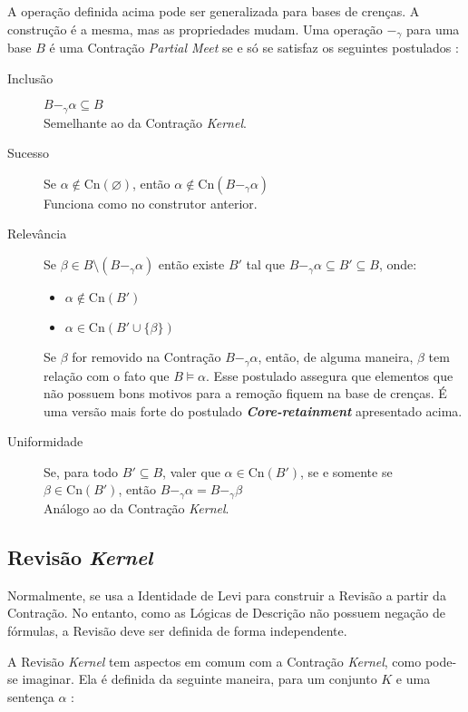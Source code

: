 A operação definida acima pode ser generalizada para bases de crenças. A construção é a mesma, mas as propriedades mudam. Uma operação $ -_{\gamma} $ para uma base $ B $ é uma Contração \textit{Partial Meet} se e só se satisfaz os seguintes postulados \citep{revisaoHansson2}:

\begin{description}
	\item[Inclusão] $ B -_{\gamma} \alpha \subseteq B$ \\ Semelhante ao da Contração \textit{Kernel}.
	\item[Sucesso] Se $ \alpha \notin \text{Cn}(\varnothing) $, então $ \alpha \notin \text{Cn}(B -_{\gamma} \alpha) $ \\ Funciona como no construtor anterior.
	\item[Relevância] Se $ \beta \in B \setminus (B -_{\gamma} \alpha) $ então existe  $ B' $ tal que $B -_{\gamma} \alpha \subseteq B' \subseteq B $, onde:
	\begin{itemize}
		\item $ \alpha \notin \text{Cn}(B') $
		\item $ \alpha \in \text{Cn}(B' \cup \{\beta\}) $ 
	\end{itemize}
	Se $ \beta $ for removido na Contração $ B -_{\gamma} \alpha $, então, de alguma maneira, $ \beta $ tem relação com o fato que $ B \models \alpha$. Esse postulado assegura que elementos que não possuem bons motivos para a remoção fiquem na base de crenças. É uma versão mais forte do postulado \textbf{\textit{Core-retainment}} apresentado acima.
	\item[Uniformidade] Se, para todo $B' \subseteq B $, valer que $ \alpha \in \text{Cn}(B') $, se e somente se $ \beta \in \text{Cn}(B') $, então $ B -_{\gamma} \alpha = B -_{\gamma} \beta $ \\
	Análogo ao da Contração \textit{Kernel}. 
	
\end{description}

\subsection{Revisão \textit{Kernel}}

Normalmente, se usa a Identidade de Levi para construir a Revisão a partir da Contração. No entanto, como as Lógicas de Descrição não possuem negação de fórmulas, a Revisão deve ser definida de forma independente.

A Revisão \textit{Kernel} tem aspectos em comum com a Contração \textit{Kernel}, como pode-se imaginar. Ela é definida da seguinte maneira, para um conjunto $ K $ e uma sentença $ \alpha $ \citep{revisaoRibeiro2}:

